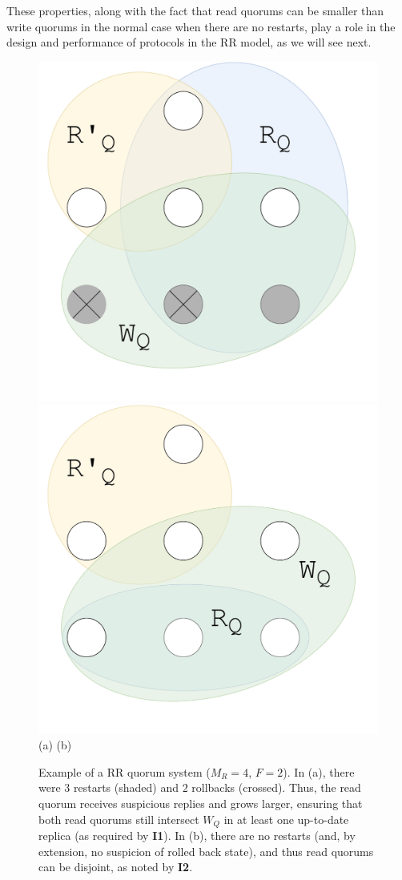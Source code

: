 These properties, along with the fact that read quorums can be
smaller than write quorums in the normal case when there
are no restarts, play a role in the design and performance of
protocols in the \ac{RR} model, as we will see next.

\begin{figure}[t]
    \centering
        \includegraphics[width=.32\linewidth]{img/RR_quorums_I1}
        \includegraphics[width=.32\linewidth]{img/RR_quorums_I2}\\
        (a) \hspace{2.3cm} (b) \hspace{.2cm}
    \caption{Example of a  \ac{RR} quorum system ($M_R=4$,
    $F=2$). In (a), there were $3$ restarts (shaded) and $2$ rollbacks
    (crossed). Thus, the read quorum receives suspicious replies and
    grows larger, ensuring that both read quorums still intersect $W_Q$ in
    at least one up-to-date replica (as required by \textbf{I1}).
    In (b), there are no restarts (and, by extension, no
    suspicion of rolled back state), and thus read quorums can be
    disjoint, as noted by \textbf{I2}.}\label{fig:quorums}
\end{figure}

